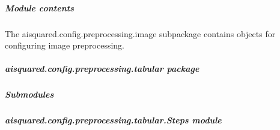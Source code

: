 \documentclass[letterpaper,10pt,english]{sphinxmanual}
\begin{document}
\subparagraph{Module contents}
\label{\detokenize{aisquared.config.preprocessing.image:module-aisquared.config.preprocessing.image}}\label{\detokenize{aisquared.config.preprocessing.image:module-contents}}
\sphinxAtStartPar
The aisquared.config.preprocessing.image subpackage contains objects for configuring image preprocessing.

\sphinxstepscope


\subparagraph{aisquared.config.preprocessing.tabular package}
\label{\detokenize{aisquared.config.preprocessing.tabular:aisquared-config-preprocessing-tabular-package}}\label{\detokenize{aisquared.config.preprocessing.tabular::doc}}

\subparagraph{Submodules}
\label{\detokenize{aisquared.config.preprocessing.tabular:submodules}}

\subparagraph{aisquared.config.preprocessing.tabular.Steps module}
\label{\detokenize{aisquared.config.preprocessing.tabular:module-aisquared.config.preprocessing.tabular.Steps}}\label{\detokenize{aisquared.config.preprocessing.tabular:aisquared-config-preprocessing-tabular-steps-module}}
\end{document}
